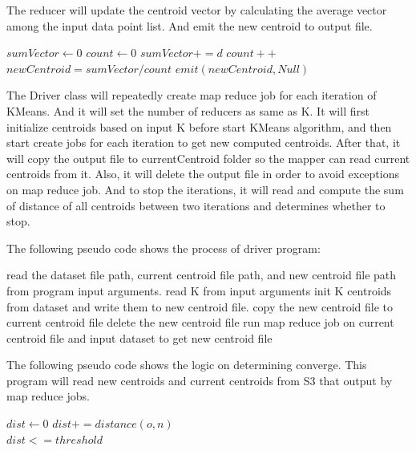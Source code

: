 \documentclass[11pt]{article} %
\begin{document}
The reducer will update the centroid vector by calculating the average vector among the input data point list. And emit the new centroid to output file.
\begin{algorithmic}[1]
\State $sumVector \gets 0$
\State $count \gets 0$
	\State $sumVector +=  d$
	\State $count ++$
\EndFor
\State $newCentroid = sumVector / count$
\State $emit(newCentroid, Null)$
\EndFunction
\end{algorithmic}

The Driver class will repeatedly create map reduce job for each iteration of KMeans. And it will set the number of reducers as same as K. It will first initialize centroids based on input K before start KMeans algorithm, and then start create jobs for each iteration to get new computed centroids. After that, it will copy the output file to currentCentroid folder so the mapper can read current centroids from it. Also, it will delete the output file in order to avoid exceptions on map reduce job. And to stop the iterations, it will read and compute the sum of distance of all centroids between two iterations and determines whether to stop.

The following pseudo code shows the process of driver program:
\begin{algorithmic}[1]
\State read the dataset file path, current centroid file path, and new centroid file path from program input arguments.
\State read K from input arguments
\State init K centroids from dataset and write them to new centroid file.
	\State copy the new centroid file to current centroid file
	\State delete the new centroid file
	\State run map reduce job on current centroid file and input dataset to get new centroid file
\EndWhile

\EndFunction
\end{algorithmic}

The following pseudo code shows the logic on determining converge. This program will read new centroids and current centroids from S3 that output by map reduce jobs.

\begin{algorithmic}[1]
\State $dist \gets 0$
	\State $dist += distance(o, n)$
\EndFor \\
\Return $dist <= threshold$
\EndFunction
\end{algorithmic}
\end{document}
